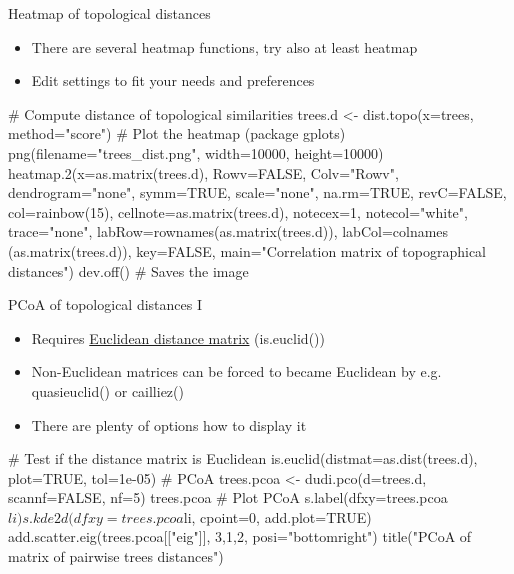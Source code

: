 \documentclass[compress,  xelatex, 11pt, xcolor=x11names, aspectratio=169,
	hyperref={
		bookmarks=true,
		unicode=true,
		colorlinks=true,
		pdftitle={HybSeq course},
		plainpages=false,
		pdfauthor={Vojtech Zeisek},
		pdfsubject={Practical processing of HybSeq target enrichment sequencing data on computing grids like MetaCentrum},
		pdfcreator={XeLaTeX},
		pdfkeywords={BASH, command line, GNU, HybSeq, Linux, MetaCentrum, sequencing shell, target enrichment},
		linkcolor=Turquoise4, %
		anchorcolor=DodgerBlue4, %
		citecolor=DodgerBlue4, %
		filecolor=DodgerBlue4, %
		menucolor=Tan4, %
		urlcolor=DarkOliveGreen4 %
		},
	url={hyphens, lowtilde} %
	]{beamer}
\renewcommand{\texttt}[1]{\colorbox{Cornsilk2}{{\ttfamily #1}}}
\begin{document}
\begin{frame}[fragile]{Heatmap of topological distances}
	\begin{itemize}
		\item There are several heatmap functions, try also at least \texttt{heatmap}
		\item Edit settings to fit your needs and preferences
	\end{itemize}
	\begin{spluscode}
    # Compute distance of topological similarities
    trees.d <- dist.topo(x=trees, method="score")
    # Plot the heatmap (package gplots)
    png(filename="trees_dist.png", width=10000, height=10000)
      heatmap.2(x=as.matrix(trees.d), Rowv=FALSE, Colv="Rowv",
        dendrogram="none", symm=TRUE, scale="none", na.rm=TRUE,
        revC=FALSE, col=rainbow(15), cellnote=as.matrix(trees.d),
        notecex=1, notecol="white", trace="none",
        labRow=rownames(as.matrix(trees.d)), labCol=colnames
        (as.matrix(trees.d)), key=FALSE, main="Correlation
        matrix of topographical distances")
      dev.off() # Saves the image
	\end{spluscode}
\end{frame}

\begin{frame}[fragile]{PCoA of topological distances I}
	\begin{itemize}
		\item Requires \href{https://en.wikipedia.org/wiki/Euclidean_distance_matrix}{Euclidean distance matrix} (\texttt{is.euclid()})
		\item Non-Euclidean matrices can be forced to became Euclidean by e.g. \texttt{quasieuclid()} or \texttt{cailliez()}
		\item There are plenty of options how to display it
	\end{itemize}
	\begin{spluscode}
    # Test if the distance matrix is Euclidean
    is.euclid(distmat=as.dist(trees.d), plot=TRUE, tol=1e-05)
    # PCoA
    trees.pcoa <- dudi.pco(d=trees.d, scannf=FALSE, nf=5)
    trees.pcoa
    # Plot PCoA
    s.label(dfxy=trees.pcoa$li)
    s.kde2d(dfxy=trees.pcoa$li, cpoint=0, add.plot=TRUE)
    add.scatter.eig(trees.pcoa[["eig"]], 3,1,2, posi="bottomright")
    title("PCoA of matrix of pairwise trees distances")
	\end{spluscode}
\end{frame}
\end{document}
